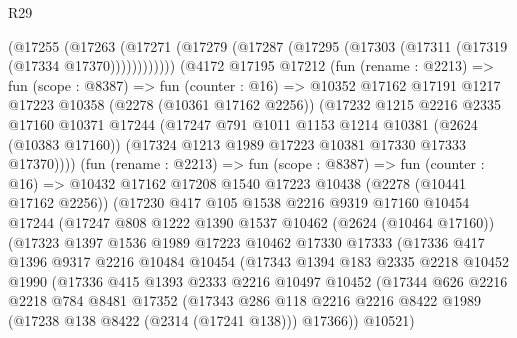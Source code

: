 \begin{lexlean}{R29}
\begin{coremodule}
          (@17255
            (@17263
              (@17271 (@17279 (@17287 (@17295 (@17303 (@17311 (@17319 (@17334 @17370))))))))))))
      (@4172
        @17195
        @17212
        (fun (rename : @2213) =>
        fun (scope : @8387) =>
        fun (counter : @16) =>
        @10352
          @17162
          @17191
          @1217
          @17223
          @10358
          (@2278 (@10361 @17162 @2256))
          (@17232
            @1215
            @2216
            @2335
            @17160
            @10371
            @17244
            (@17247
              @791
              @1011
              @1153
              @1214
              @10381
              (@2624 (@10383 @17160))
              (@17324 @1213 @1989 @17223 @10381 @17330 @17333 @17370))))
        (fun (rename : @2213) =>
        fun (scope : @8387) =>
        fun (counter : @16) =>
        @10432
          @17162
          @17208
          @1540
          @17223
          @10438
          (@2278 (@10441 @17162 @2256))
          (@17230
            @417
            @105
            @1538
            @2216
            @9319
            @17160
            @10454
            @17244
            (@17247
              @808
              @1222
              @1390
              @1537
              @10462
              (@2624 (@10464 @17160))
              (@17323
                @1397
                @1536
                @1989
                @17223
                @10462
                @17330
                @17333
                (@17336
                  @417
                  @1396
                  @9317
                  @2216
                  @10484
                  @10454
                  (@17343
                    @1394
                    @183
                    @2335
                    @2218
                    @10452
                    @1990
                    (@17336
                      @415
                      @1393
                      @2333
                      @2216
                      @10497
                      @10452
                      (@17344
                        @626
                        @2216
                        @2218
                        @784
                        @8481
                        @17352
                        (@17343
                          @286
                          @118
                          @2216
                          @2216
                          @8422
                          @1989
                          (@17238 @138 @8422 (@2314 (@17241 @138)))
                          @17366))
                      @10521)

\end{coremodule}
\end{lexlean}
